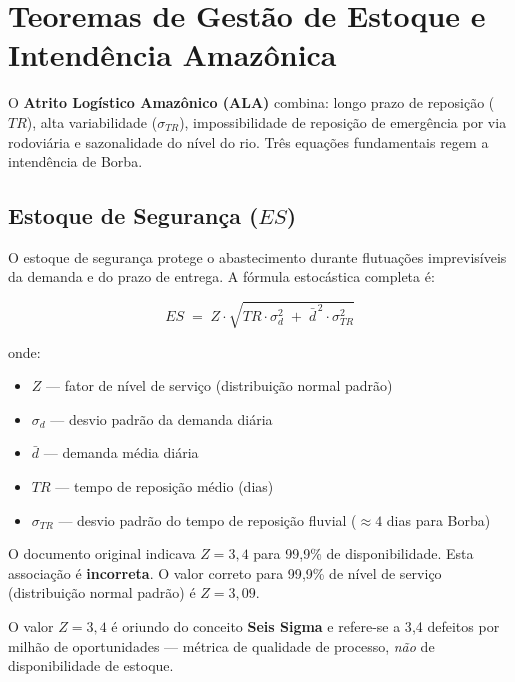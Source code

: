 \documentclass[12pt,a4paper]{article}
\begin{document}
\section{Teoremas de Gestão de Estoque e Intendência Amazônica}

O \textbf{Atrito Logístico Amazônico (ALA)} combina: longo prazo de reposição ($TR$), alta variabilidade ($\sigma_{TR}$), impossibilidade de reposição de emergência por via rodoviária e sazonalidade do nível do rio. Três equações fundamentais regem a intendência de Borba.

\subsection{Estoque de Segurança (\texorpdfstring{$ES$}{ES})}

O estoque de segurança protege o abastecimento durante flutuações imprevisíveis da demanda e do prazo de entrega. A fórmula estocástica completa é:

\begin{formulabox}
\[
  ES \;=\; Z \cdot \sqrt{TR \cdot \sigma_d^2 \;+\; \bar{d}^{\,2} \cdot \sigma_{TR}^2}
\]
\end{formulabox}

\noindent onde:
\begin{itemize}
  \item $Z$ --- fator de nível de serviço (distribuição normal padrão)
  \item $\sigma_d$ --- desvio padrão da demanda diária
  \item $\bar{d}$ --- demanda média diária
  \item $TR$ --- tempo de reposição médio (dias)
  \item $\sigma_{TR}$ --- desvio padrão do tempo de reposição fluvial ($\approx 4$ dias para Borba)
\end{itemize}

\begin{alertbox}
O documento original indicava $Z = 3{,}4$ para 99{,}9\% de disponibilidade. Esta associação é \textbf{incorreta}. O valor correto para 99{,}9\% de nível de serviço (distribuição normal padrão) é $Z = 3{,}09$.

O valor $Z = 3{,}4$ é oriundo do conceito \textbf{Seis Sigma} e refere-se a 3{,}4 defeitos por milhão de oportunidades --- métrica de qualidade de processo, \emph{não} de disponibilidade de estoque.
\end{alertbox}
\end{document}
